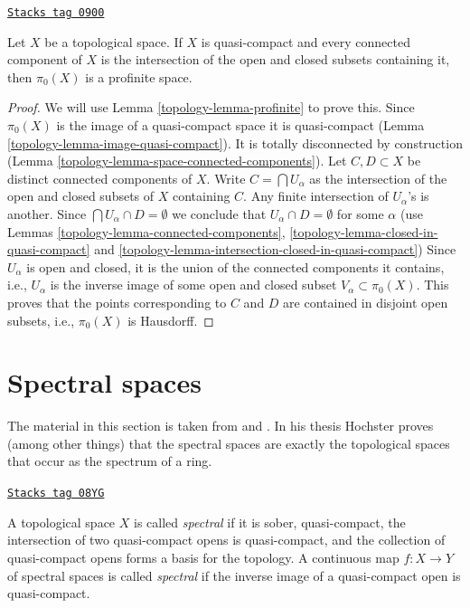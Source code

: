\begin{lemma}[Pi0 profinite]
\label{topology-lemma-pi0-profinite}
\href{https://stacks.math.columbia.edu/tag/0900}{\texttt{Stacks tag 0900}}

Let $X$ be a topological space. If $X$ is quasi-compact
and every connected component of $X$ is the intersection
of the open and closed subsets containing it, then $\pi_0(X)$
is a profinite space.
\end{lemma}

\begin{proof}

We will use Lemma \ref{topology-lemma-profinite} to prove this.
Since $\pi_0(X)$ is the image of a quasi-compact space it is
quasi-compact (Lemma \ref{topology-lemma-image-quasi-compact}).
It is totally disconnected by construction
(Lemma \ref{topology-lemma-space-connected-components}).
Let $C, D \subset X$ be distinct connected components of $X$.
Write $C = \bigcap U_\alpha$ as the intersection of the open and
closed subsets of $X$ containing $C$. Any finite intersection
of $U_\alpha$'s is another. Since $\bigcap U_\alpha \cap D = \emptyset$
we conclude that $U_\alpha \cap D = \emptyset$ for some $\alpha$
(use Lemmas \ref{topology-lemma-connected-components},
\ref{topology-lemma-closed-in-quasi-compact} and
\ref{topology-lemma-intersection-closed-in-quasi-compact})
Since $U_\alpha$ is open and closed, it is the union of the
connected components it contains, i.e., $U_\alpha$ is the inverse
image of some open and closed subset $V_\alpha \subset \pi_0(X)$.
This proves that the points corresponding to $C$ and $D$
are contained in disjoint open subsets, i.e., $\pi_0(X)$ is
Hausdorff.
\end{proof}

\section{Spectral spaces}
\label{topology-section-spectral}
The material in this section is taken from \cite{Hochster} and
\cite{Hochster-thesis}. In his thesis Hochster proves (among
other things) that the spectral spaces are exactly the topological
spaces that occur as the spectrum of a ring.

\begin{definition}
\label{topology-definition-spectral-space}
\href{https://stacks.math.columbia.edu/tag/08YG}{\texttt{Stacks tag 08YG}}

A topological space $X$ is called {\it spectral} if it is sober,
quasi-compact, the intersection of two quasi-compact opens is
quasi-compact, and the collection of quasi-compact opens forms a
basis for the topology. A continuous map $f : X \to Y$ of spectral
spaces is called {\it spectral} if the inverse image of a quasi-compact
open is quasi-compact.
\end{definition}

